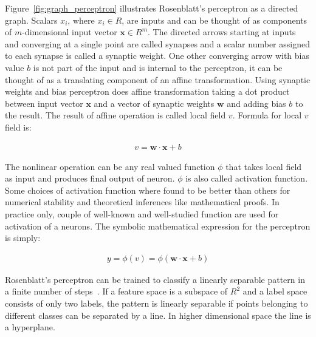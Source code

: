 \documentclass[english, 12pt, a4paper, elec, utf8, online]{aaltothesis}
\begin{document}
Figure~\ref{fig:graph_perceptron} illustrates Rosenblatt's perceptron as a directed graph. Scalars $x_{i}$, where $x_i \in R$, are inputs and can be thought of as components of $m$-dimensional input vector $\mathbf{x} \in R^{m}$. The directed arrows starting at inputs and converging at a single point are called synapses and a scalar number assigned to each synapse is called a synaptic weight. One other converging arrow with bias value $b$ is not part of the input and is internal to the perceptron, it can be thought of as a translating component of an affine transformation. Using synaptic weights and bias perceptron does affine transformation taking a dot product between input vector $\mathbf{x}$ and a vector of synaptic weights $\mathbf{w}$ and adding bias $b$ to the result. The result of affine operation is called local field $v$. Formula for local $v$ field is:

\begin{align*}
v = \mathbf{w} \cdot \mathbf{x} + b 
\end{align*}

The nonlinear operation can be any real valued function $\phi$ that takes local field as input and produces final output of neuron. $\phi$ is also called activation function. Some choices of activation function where found to be better than others for numerical stability and theoretical inferences like mathematical proofs. In practice only, couple of well-known and well-studied function are used for activation of a neurons. The symbolic mathematical expression for the perceptron is simply:

\begin{align}\label{eq:perceptron}
y = \phi(v) = \phi(\mathbf{w} \cdot \mathbf{x} + b) 
\end{align}

Rosenblatt’s perceptron can be trained to classify a linearly separable pattern in a finite number of steps~\cite{haykin2009neural}. If a feature space is a subspace of $R^2$ and a label space consists of only two labels, the pattern is linearly separable if points belonging to different classes can be separated by a line. In higher dimensional space the line is a hyperplane. 
\end{document}
